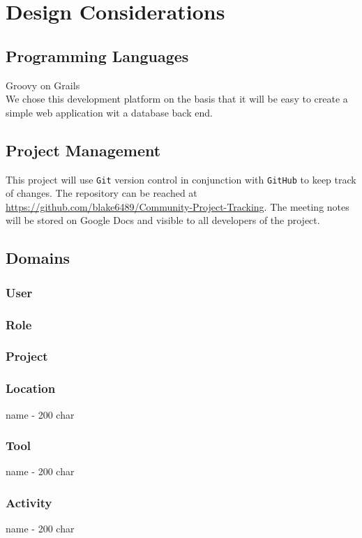 \documentclass[12pt]{article}
\newcommand{\e}[1] {{\tt #1}}
\begin{document}
\section{Design Considerations}

\subsection{Programming Languages}
Groovy on Grails \\
We chose this development platform on the basis that it will be easy to create a simple web application wit a database back end.

\subsection{Project Management}
This project will use \e{Git} version control in conjunction with \e{GitHub} to keep track of changes. The repository can be reached at \url{https://github.com/blake6489/Community-Project-Tracking}.
The meeting notes will be stored on Google Docs and visible to all developers of the project.


\subsection{Domains}\label{sec:Domains}
\subsubsection{User}
\subsubsection{Role}
\subsubsection{Project}
\subsubsection{Location}
 name - 200 char\\
\subsubsection{Tool}
 name - 200 char\\
\subsubsection{Activity}
 name - 200 char\\
\end{document}
